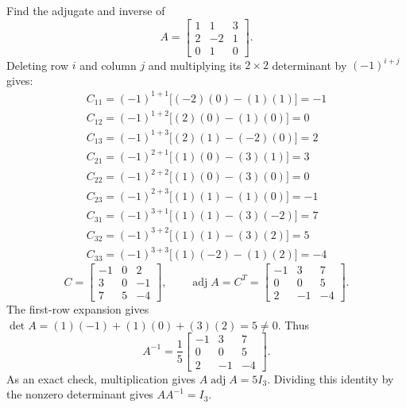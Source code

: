 \goal Find the adjugate and inverse of
\[A=\begin{bmatrix}1&1&3\\2&-2&1\\0&1&0\end{bmatrix}.\]
Deleting row $i$ and column $j$ and multiplying its $2\times2$ determinant by $(-1)^{i+j}$ gives:
\[\begin{gathered}
C_{11}=(-1)^{1+1}\big[(-2)(0)-(1)(1)\big]=-1\\C_{12}=(-1)^{1+2}\big[(2)(0)-(1)(0)\big]=0\\C_{13}=(-1)^{1+3}\big[(2)(1)-(-2)(0)\big]=2\\C_{21}=(-1)^{2+1}\big[(1)(0)-(3)(1)\big]=3\\C_{22}=(-1)^{2+2}\big[(1)(0)-(3)(0)\big]=0\\C_{23}=(-1)^{2+3}\big[(1)(1)-(1)(0)\big]=-1\\C_{31}=(-1)^{3+1}\big[(1)(1)-(3)(-2)\big]=7\\C_{32}=(-1)^{3+2}\big[(1)(1)-(3)(2)\big]=5\\C_{33}=(-1)^{3+3}\big[(1)(-2)-(1)(2)\big]=-4
\end{gathered}\]
\[C=\begin{bmatrix}-1&0&2\\3&0&-1\\7&5&-4\end{bmatrix},\qquad\operatorname{adj}A=C^T=\begin{bmatrix}-1&3&7\\0&0&5\\2&-1&-4\end{bmatrix}.\]
The first-row expansion gives $\det A=(1)(-1) + (1)(0) + (3)(2)=5\ne0$. Thus
\[A^{-1}=\frac{1}{5}\begin{bmatrix}-1&3&7\\0&0&5\\2&-1&-4\end{bmatrix}.\]
As an exact check, multiplication gives $A\operatorname{adj}A=5I_3$. Dividing this identity by the nonzero determinant gives $AA^{-1}=I_3$.


